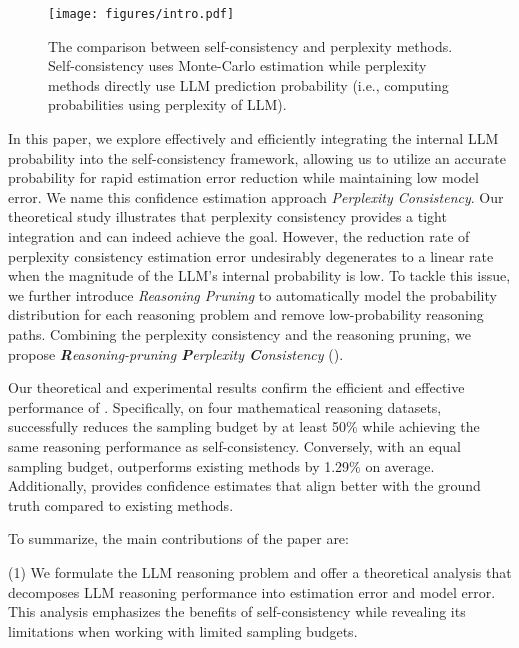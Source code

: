 \begin{figure}[t]
    \begin{center}
    \centerline{\texttt{[image: figures/intro.pdf]}}
    \caption{
        The comparison between self-consistency and perplexity methods. Self-consistency uses Monte-Carlo estimation while perplexity methods directly use LLM prediction probability (i.e., computing probabilities using perplexity of LLM).}
    \label{fig:intro-comparison}
    \end{center}
    \vskip -0.4in
\end{figure}

In this paper, we explore effectively and efficiently integrating the internal LLM probability into the self-consistency framework, allowing us to utilize an accurate probability for rapid estimation error reduction while maintaining low model error.
We name this confidence estimation approach \emph{Perplexity Consistency}.
Our theoretical study illustrates that perplexity consistency provides a tight integration and can indeed achieve the goal.
However, the reduction rate of perplexity consistency estimation error undesirably degenerates to a linear rate when the magnitude of the LLM's internal probability is low. 
To tackle this issue, we further introduce \emph{Reasoning Pruning} to automatically model the probability distribution for each reasoning problem and remove low-probability reasoning paths. 
Combining the perplexity consistency and the reasoning pruning, we propose \emph{\textbf{R}easoning-pruning \textbf{P}erplexity \textbf{C}onsistency} (\RPC).

Our theoretical and experimental results confirm the efficient and effective performance of \RPC. 
Specifically, on four mathematical reasoning datasets, \RPC successfully reduces the sampling budget by at least 50\% while achieving the same reasoning performance as self-consistency. 
Conversely, with an equal sampling budget, \RPC outperforms existing methods by 1.29\% on average.
Additionally, \RPC provides confidence estimates that align better with the ground truth compared to existing methods.

To summarize, the main contributions of the paper are:

(1) We formulate the LLM reasoning problem and offer a theoretical analysis that decomposes LLM reasoning performance into estimation error and model error. This analysis emphasizes the benefits of self-consistency while revealing its limitations when working with limited sampling budgets.

